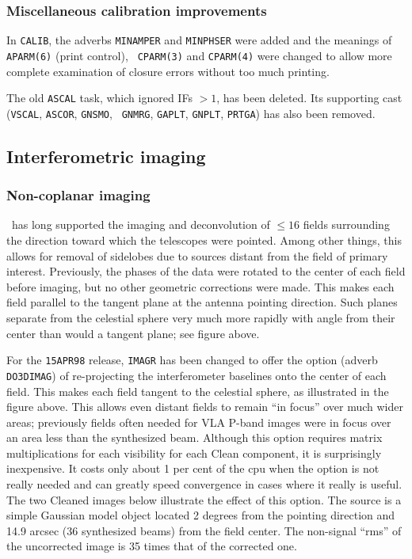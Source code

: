 \subsubsection{Miscellaneous calibration improvements}

In {\tt CALIB}, the adverbs {\tt MINAMPER} and {\tt MINPHSER} were
added and the meanings of {\tt APARM(6)} (print control), {\tt
CPARM(3)} and {\tt CPARM(4)} were changed to allow more complete
examination of closure errors without too much printing.

The old {\tt ASCAL} task, which ignored IFs $> 1$, has been deleted.
Its supporting cast ({\tt VSCAL}, {\tt ASCOR}, {\tt GNSMO}, {\tt
GNMRG}, {\tt GAPLT}, {\tt GNPLT}, {\tt PRTGA}) has also been removed.

\subsection{Interferometric imaging}

\subsubsection{Non-coplanar imaging}

\centerline{
}

\AIPS\ has long supported the imaging and deconvolution of $\le 16$
fields surrounding the direction toward which the telescopes were
pointed.  Among other things, this allows for removal of sidelobes due
to sources distant from the field of primary interest.  Previously,
the phases of the data were rotated to the center of each field before
imaging, but no other geometric corrections were made.  This makes
each field parallel to the tangent plane at the antenna pointing
direction.  Such planes separate from the celestial sphere very much
more rapidly with angle from their center than would a tangent plane;
see figure above.
\eject

For the {\tt 15APR98} release, {\tt IMAGR} has been changed to offer
the option (adverb {\tt DO3DIMAG}) of re-projecting the interferometer
baselines onto the center of each field.  This makes each field
tangent to the celestial sphere, as illustrated in the figure above.
This allows even distant fields to remain ``in focus'' over much wider
areas; previously fields often needed for VLA P-band images were in
focus over an area less than the synthesized beam.  Although this
option requires matrix multiplications for each visibility for each
Clean component, it is surprisingly inexpensive.  It costs only about 1
per cent of the cpu when the option is not really needed and can
greatly speed convergence in cases where it really is useful.  The two
Cleaned images below illustrate the effect of this option.  The source
is a simple Gaussian model object located 2 degrees from the pointing
direction and 14.9 arcsec (36 synthesized beams) from the field center.
The non-signal ``rms'' of the uncorrected image is 35 times that of
the corrected one.

